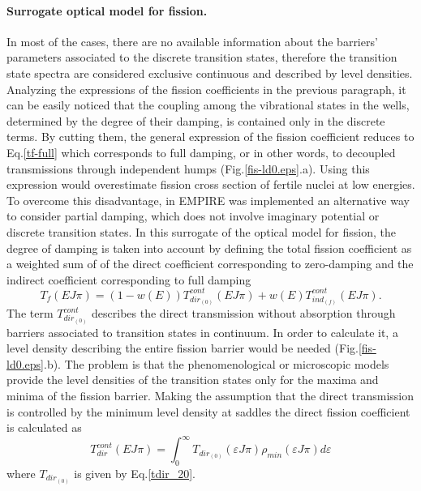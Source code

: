 \documentclass[twocolumn,amsmath,amssymb,10pt,groupedaddress,a4paper]{revtex4}
\begin{document}
\paragraph*{Surrogate optical model for fission.}
In most of the cases, there are no available information about the barriers' parameters
associated to the discrete transition states, therefore the transition state spectra are
considered exclusive continuous and described by level densities. Analyzing the expressions
of the fission coefficients in the previous paragraph, it can be easily noticed that the
coupling among the vibrational states in the wells, determined by the degree of their damping,
is contained only in the discrete terms. By cutting them, the general expression of the fission
coefficient reduces to Eq.\ref{tf-full} which corresponds to full damping, or in other words,
 to decoupled
transmissions through independent humps (Fig.\ref{fis-ld0.eps}.a). Using this expression would overestimate fission cross
section of fertile nuclei at low energies. To overcome this disadvantage, in EMPIRE was
implemented an alternative way to consider partial damping, which does not involve imaginary
potential or discrete transition states.
In this surrogate of the optical model for fission, the degree of
damping is taken into account by defining the total fission coefficient as a weighted sum of
of the direct coefficient corresponding to zero-damping and the indirect coefficient
corresponding to full damping
%
\begin{equation}
T_{f}(E J \pi)=(1-w(E))T_{dir_{(0)}}^{cont}(E J \pi)+w(E)T_{ind_{(f)}}^{cont}(E J \pi).
\label{tfsurr}
\end{equation}
%
The term $T_{dir_{(0)}}^{cont}$ describes the direct transmission without absorption through
barriers associated to transition states in continuum. In order to calculate it, a level
density describing the entire fission barrier would be needed (Fig.\ref{fis-ld0.eps}.b).
The problem is that the phenomenological
or microscopic models provide the level densities of the transition states only for the
maxima and minima of the fission barrier. Making the assumption that the direct transmission
is controlled by the minimum level density at saddles the direct fission coefficient is
calculated as
%
\begin{equation}
T_{dir}^{cont}(EJ\pi)=\int_0^{\infty}T_{dir_{(0)}}(\varepsilon J \pi)\rho_{min} (\varepsilon J \pi)
d \varepsilon
\end{equation}
where $T_{dir_{(0)}}$ is given by Eq.\ref{tdir_20}.
\end{document}
